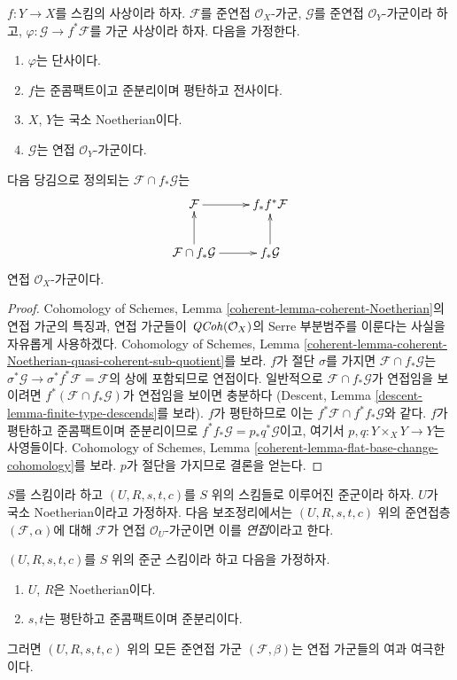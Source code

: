 \begin{lemma}
\label{lemma-push-pull}
$f : Y \to X$를 스킴의 사상이라 하자. $\mathcal{F}$를 준연접 $\mathcal{O}_X$-가군,
$\mathcal{G}$를 준연접 $\mathcal{O}_Y$-가군이라 하고, $\varphi : \mathcal{G} \to f^*\mathcal{F}$를 가군 사상이라 하자.
다음을 가정한다.
\begin{enumerate}
\item $\varphi$는 단사이다.
\item $f$는 준콤팩트이고 준분리이며 평탄하고 전사이다.
\item $X$, $Y$는 국소 Noetherian이다.
\item $\mathcal{G}$는 연접 $\mathcal{O}_Y$-가군이다.
\end{enumerate}
다음 당김으로 정의되는 $\mathcal{F} \cap f_*\mathcal{G}$는
$$
\xymatrix{
\mathcal{F} \ar[r] & f_*f^*\mathcal{F} \\
\mathcal{F} \cap f_*\mathcal{G} \ar[u] \ar[r] &
f_*\mathcal{G} \ar[u]
}
$$
연접 $\mathcal{O}_X$-가군이다.
\end{lemma}

\begin{proof}
Cohomology of Schemes, Lemma \ref{coherent-lemma-coherent-Noetherian}의 연접 가군의 특징과,
연접 가군들이 $\mathit{QCoh}(\mathcal{O}_X)$의 Serre 부분범주를 이룬다는 사실을 자유롭게 사용하겠다.
Cohomology of Schemes, Lemma \ref{coherent-lemma-coherent-Noetherian-quasi-coherent-sub-quotient}를 보라.
$f$가 절단 $\sigma$를 가지면 $\mathcal{F} \cap f_*\mathcal{G}$는
$\sigma^*\mathcal{G} \to \sigma^*f^*\mathcal{F} = \mathcal{F}$의 상에 포함되므로 연접이다. 일반적으로
$\mathcal{F} \cap f_*\mathcal{G}$가 연접임을 보이려면 $f^*(\mathcal{F} \cap f_*\mathcal{G})$가 연접임을 보이면 충분하다
(Descent, Lemma \ref{descent-lemma-finite-type-descends}를 보라). $f$가 평탄하므로 이는
$f^*\mathcal{F} \cap f^*f_*\mathcal{G}$와 같다. $f$가 평탄하고 준콤팩트이며 준분리이므로
$f^*f_*\mathcal{G} = p_*q^*\mathcal{G}$이고, 여기서 $p, q : Y \times_X Y \to Y$는 사영들이다.
Cohomology of Schemes, Lemma \ref{coherent-lemma-flat-base-change-cohomology}를 보라. $p$가 절단을 가지므로 결론을 얻는다.
\end{proof}

\noindent
$S$를 스킴이라 하고 $(U, R, s, t, c)$를 $S$ 위의 스킴들로 이루어진 준군이라 하자. $U$가 국소 Noetherian이라고 가정하자.
다음 보조정리에서는 $(U, R, s, t, c)$ 위의 준연접층 $(\mathcal{F}, \alpha)$에 대해 $\mathcal{F}$가 연접
$\mathcal{O}_U$-가군이면 이를 {\it 연접}이라고 한다.

\begin{lemma}
\label{lemma-colimit-coherent}
$(U, R, s, t, c)$를 $S$ 위의 준군 스킴이라 하고 다음을 가정하자.
\begin{enumerate}
\item $U$, $R$은 Noetherian이다.
\item $s, t$는 평탄하고 준콤팩트이며 준분리이다.
\end{enumerate}
그러면 $(U, R, s, t, c)$ 위의 모든 준연접 가군 $(\mathcal{F}, \beta)$는 연접 가군들의 여과 여극한이다.
\end{lemma}

